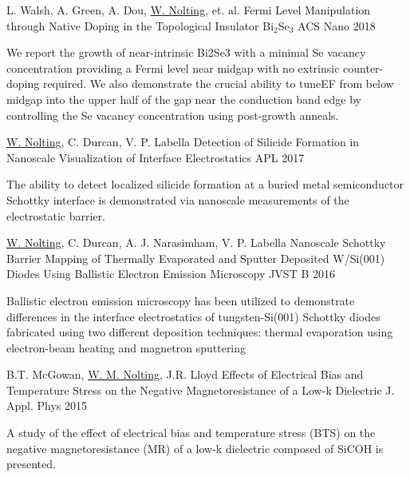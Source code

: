 \begin{cventries}
\cventrywrite
{L. Walsh, A. Green, A. Dou, \underline{W. Nolting}, et. al.} %
{Fermi Level Manipulation through Native Doping in the Topological Insulator Bi$_2$Se$_3$} %
{ACS Nano} %
{2018} %
{
  \begin{cvitems} %
    \item {We report the growth of near-intrinsic Bi2Se3 with a minimal Se vacancy concentration providing a Fermi level near midgap with no extrinsic counter-doping required. We also demonstrate the crucial ability to tuneEF from below midgap into the upper half of the gap near the conduction band edge by controlling the Se vacancy concentration using post-growth anneals.}
  \end{cvitems}
}

\cventrywrite
{\underline{W. Nolting}, C. Durcan, V. P. Labella} %
{Detection of Silicide Formation in Nanoscale Visualization of Interface Electrostatics} %
{APL} %
{2017} %
{
  \begin{cvitems} %
    \item {The ability to detect localized silicide formation at a buried metal semiconductor Schottky interface is demonstrated via nanoscale measurements of the electrostatic barrier.}
  \end{cvitems}
}

\cventrywrite
{\underline{W. Nolting}, C. Durcan, A. J. Narasimham, V. P. Labella} %
{Nanoscale Schottky Barrier Mapping of Thermally Evaporated and Sputter Deposited W/Si(001) Diodes Using Ballistic Electron Emission Microscopy} %
{JVST B} %
{2016} %
{
  \begin{cvitems} %
    \item {Ballistic electron emission microscopy has been utilized to demonstrate differences in the interface electrostatics of tungsten-Si(001) Schottky diodes fabricated using two different deposition techniques: thermal evaporation using electron-beam heating and magnetron sputtering}
  \end{cvitems}
}

\cventrywrite
{B.T. McGowan, \underline{W. M. Nolting}, J.R. Lloyd} %
{Effects of Electrical Bias and Temperature Stress on the Negative Magnetoresistance of a Low-k Dielectric} %
{J. Appl. Phys} %
{2015} %
{
  \begin{cvitems} %
    \item {A study of the effect of electrical bias and temperature stress (BTS) on the negative magnetoresistance (MR) of a low-k dielectric composed of SiCOH is presented.}
  \end{cvitems}
}


\end{cventries}
